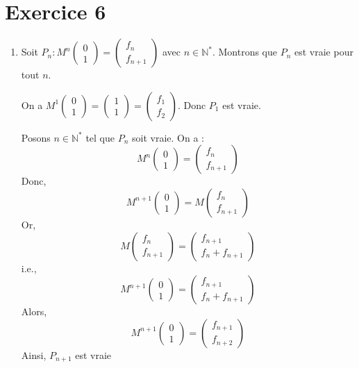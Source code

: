 \documentclass[a4paper, titlepage]{article}
\begin{document}
	\section*{Exercice 6}
	\begin{enumerate}
		\item Soit $P_n: M^n\begin{pmatrix} 0\\1 \end{pmatrix} = \begin{pmatrix} f_n\\f_{n+1} \end{pmatrix}$ avec $n\in\mathbb{N}^*$. Montrons que $P_n$ est vraie pour tout $n$.

			 On a $M^1\begin{pmatrix} 0\\1 \end{pmatrix} = \begin{pmatrix} 1\\1 \end{pmatrix} = \begin{pmatrix} f_{1}\\f_{2} \end{pmatrix}$. Donc $P_1$ est vraie.

			 Posons $n\in\mathbb{N}^*$ tel que $P_n$ soit vraie. On a :
			$$ M^n\begin{pmatrix} 0\\1 \end{pmatrix} = \begin{pmatrix} f_{n}\\f_{n+1} \end{pmatrix}  $$
			Donc,
			$$ M^{n+1}\begin{pmatrix} 0\\1 \end{pmatrix} = M\begin{pmatrix} f_n\\f_{n+1} \end{pmatrix} $$
			Or,
			$$ M\begin{pmatrix} f_n\\f_{n+1} \end{pmatrix} = \begin{pmatrix} f_{n+1}\\f_n+f_{n+1} \end{pmatrix} $$
			i.e.,
			$$ M^{n+1}\begin{pmatrix} 0\\1 \end{pmatrix} = \begin{pmatrix} f_{n+1}\\f_n+f_{n+1} \end{pmatrix} $$
			Alors,
			$$ M^{n+1}\begin{pmatrix} 0\\1 \end{pmatrix} = \begin{pmatrix} f_{n+1}\\f_{n+2} \end{pmatrix} $$
			Ainsi, $P_{n+1}$ est vraie 


\end{enumerate}
\end{document}
